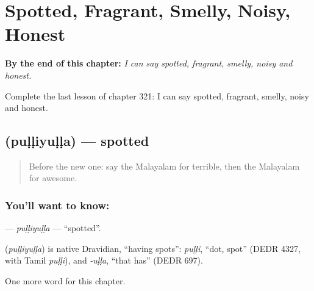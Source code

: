
\chapter{Spotted, Fragrant, Smelly, Noisy, Honest}
\label{ch:ml-spotted-fragrant-smelly-noisy-honest}

\begin{chapteropening}
\textbf{By the end of this chapter:} \emph{I can say spotted, fragrant, smelly, noisy and honest.}

Complete the last lesson of chapter 321: I can say spotted, fragrant, smelly, noisy and honest.
\end{chapteropening}

\section[\texorpdfstring{\ml{പുള്ളിയുള്ള} (puḷḷiyuḷḷa)}{പുള്ളിയുള്ള (puḷḷiyuḷḷa)}]{ (puḷḷiyuḷḷa) — spotted}

\label{lesson:ML-C321-pulliyulla}



\begin{quote}
Before the new one: say the Malayalam for terrible, then the Malayalam for awesome.
\end{quote}

\subsection*{You'll want to know: }
\textbf{} — \emph{puḷḷiyuḷḷa} — \textquotedblleft{}spotted\textquotedblright{}.

\begin{cousinweb}
\textbf{} (\emph{puḷḷiyuḷḷa}) is native Dravidian, \textquotedblleft{}having spots\textquotedblright{}: \emph{puḷḷi}, \textquotedblleft{}dot, spot\textquotedblright{} (DEDR 4327, with Tamil \emph{puḷḷi}), and \emph{-uḷḷa}, \textquotedblleft{}that has\textquotedblright{} (DEDR 697).
\end{cousinweb}

\begin{grammarlens}[title={What you've built}]
One more word for this chapter.
\end{grammarlens}

